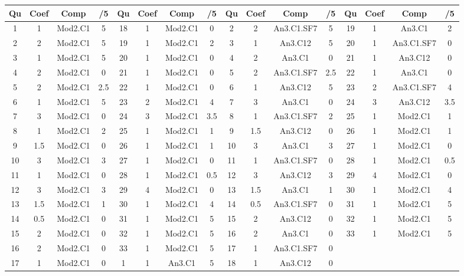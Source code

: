 \begin{center} 
\begin{tabular}{|c|c|c|c||c|c|c|c||c|c|c|c||c|c|c|c|} 
\hline \textbf{Qu} & \textbf{Coef} & \textbf{Comp} & \textbf{/5} & \textbf{Qu} & \textbf{Coef} & \textbf{Comp} & \textbf{/5} & \textbf{Qu} & \textbf{Coef} & \textbf{Comp} & \textbf{/5} & \textbf{Qu} & \textbf{Coef} & \textbf{Comp} & \textbf{/5} \\ 
\hline 
\hline 
1 & 1 & Mod2.C1 & 5 & 18 & 1 & Mod2.C1 & 0 & 2 & 2 & An3.C1.SF7 & 5 & 19 & 1 & An3.C1 & 2 \\ \hline 
2 & 2 & Mod2.C1 & 5 & 19 & 1 & Mod2.C1 & 2 & 3 & 1 & An3.C12 & 5 & 20 & 1 & An3.C1.SF7 & 0 \\ \hline 
3 & 1 & Mod2.C1 & 5 & 20 & 1 & Mod2.C1 & 0 & 4 & 2 & An3.C1 & 0 & 21 & 1 & An3.C12 & 0 \\ \hline 
4 & 2 & Mod2.C1 & 0 & 21 & 1 & Mod2.C1 & 0 & 5 & 2 & An3.C1.SF7 & 2.5 & 22 & 1 & An3.C1 & 0 \\ \hline 
5 & 2 & Mod2.C1 & 2.5 & 22 & 1 & Mod2.C1 & 0 & 6 & 1 & An3.C12 & 5 & 23 & 2 & An3.C1.SF7 & 4 \\ \hline 
6 & 1 & Mod2.C1 & 5 & 23 & 2 & Mod2.C1 & 4 & 7 & 3 & An3.C1 & 0 & 24 & 3 & An3.C12 & 3.5 \\ \hline 
7 & 3 & Mod2.C1 & 0 & 24 & 3 & Mod2.C1 & 3.5 & 8 & 1 & An3.C1.SF7 & 2 & 25 & 1 & Mod2.C1 & 1 \\ \hline 
8 & 1 & Mod2.C1 & 2 & 25 & 1 & Mod2.C1 & 1 & 9 & 1.5 & An3.C12 & 0 & 26 & 1 & Mod2.C1 & 1 \\ \hline 
9 & 1.5 & Mod2.C1 & 0 & 26 & 1 & Mod2.C1 & 1 & 10 & 3 & An3.C1 & 3 & 27 & 1 & Mod2.C1 & 0 \\ \hline 
10 & 3 & Mod2.C1 & 3 & 27 & 1 & Mod2.C1 & 0 & 11 & 1 & An3.C1.SF7 & 0 & 28 & 1 & Mod2.C1 & 0.5 \\ \hline 
11 & 1 & Mod2.C1 & 0 & 28 & 1 & Mod2.C1 & 0.5 & 12 & 3 & An3.C12 & 3 & 29 & 4 & Mod2.C1 & 0 \\ \hline 
12 & 3 & Mod2.C1 & 3 & 29 & 4 & Mod2.C1 & 0 & 13 & 1.5 & An3.C1 & 1 & 30 & 1 & Mod2.C1 & 4 \\ \hline 
13 & 1.5 & Mod2.C1 & 1 & 30 & 1 & Mod2.C1 & 4 & 14 & 0.5 & An3.C1.SF7 & 0 & 31 & 1 & Mod2.C1 & 5 \\ \hline 
14 & 0.5 & Mod2.C1 & 0 & 31 & 1 & Mod2.C1 & 5 & 15 & 2 & An3.C12 & 0 & 32 & 1 & Mod2.C1 & 5 \\ \hline 
15 & 2 & Mod2.C1 & 0 & 32 & 1 & Mod2.C1 & 5 & 16 & 2 & An3.C1 & 0 & 33 & 1 & Mod2.C1 & 5 \\ \hline 
16 & 2 & Mod2.C1 & 0 & 33 & 1 & Mod2.C1 & 5 & 17 & 1 & An3.C1.SF7 & 0 &  &  &  &  \\ \hline 

17 & 1 & Mod2.C1 & 0 & 1 & 1 & An3.C1 & 5 & 18 & 1 & An3.C12 & 0 &  &  &  &  \\ \hline 

\end{tabular} 
\end{center} 
\normalsize 
 
